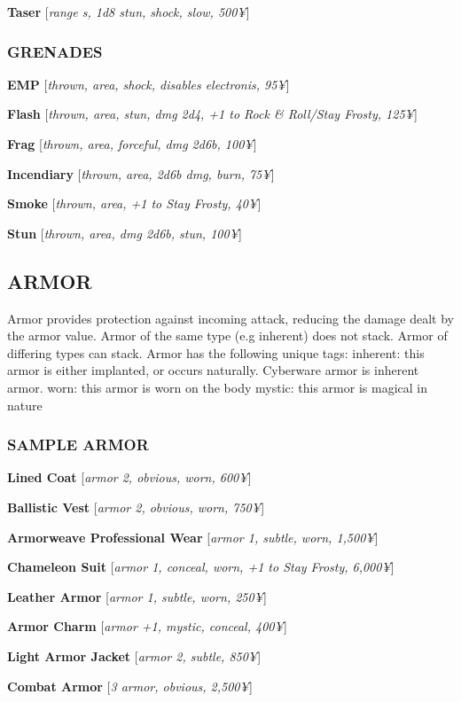 \documentclass[oneside,10pt]{article}
\begin{document}
\begin{multicols}{2}
  \textbf{Taser} [\textit{range s, 1d8 stun, shock, slow, 500¥}]


  \subsubsection{GRENADES}
  \textbf{EMP} [\textit{thrown, area, shock, disables electronis,
    95¥}]

  \textbf{Flash} [\textit{thrown, area, stun, dmg 2d4, +1 to Rock \&
    Roll/Stay Frosty, 125¥}]

  \textbf{Frag} [\textit{thrown, area, forceful, dmg 2d6b, 100¥}]

  \textbf{Incendiary} [\textit{thrown, area, 2d6b dmg, burn, 75¥}]

  \textbf{Smoke} [\textit{thrown, area, +1 to Stay Frosty, 40¥}]

  \textbf{Stun} [\textit{thrown, area, dmg 2d6b, stun, 100¥}]

  \subsection{ARMOR}
  Armor provides protection against incoming attack, reducing the
  damage dealt by the armor value. Armor of the same type (e.g
  inherent) does not stack. Armor of differing types can stack. Armor
  has the following unique tags: inherent: this armor is either
  implanted, or occurs naturally.  Cyberware armor is inherent armor.
  worn: this armor is worn on the body mystic: this armor is magical
  in nature

  \subsubsection{SAMPLE ARMOR}
  \textbf{Lined Coat} [\textit{armor 2, obvious, worn, 600¥}]

  \textbf{Ballistic Vest} [\textit{armor 2, obvious, worn, 750¥}]

  \textbf{Armorweave Professional Wear} [\textit{armor 1, subtle,
    worn, 1,500¥}]

  \textbf{Chameleon Suit} [\textit{armor 1, conceal, worn, +1 to Stay
    Frosty, 6,000¥}]

  \textbf{Leather Armor} [\textit{armor 1, subtle, worn, 250¥}]

  \textbf{Armor Charm} [\textit{armor +1, mystic, conceal, 400¥}]

  \textbf{Light Armor Jacket} [\textit{armor 2, subtle, 850¥}]

  \textbf{Combat Armor} [\textit{3 armor, obvious, 2,500¥}]


\end{multicols}
\end{document}
